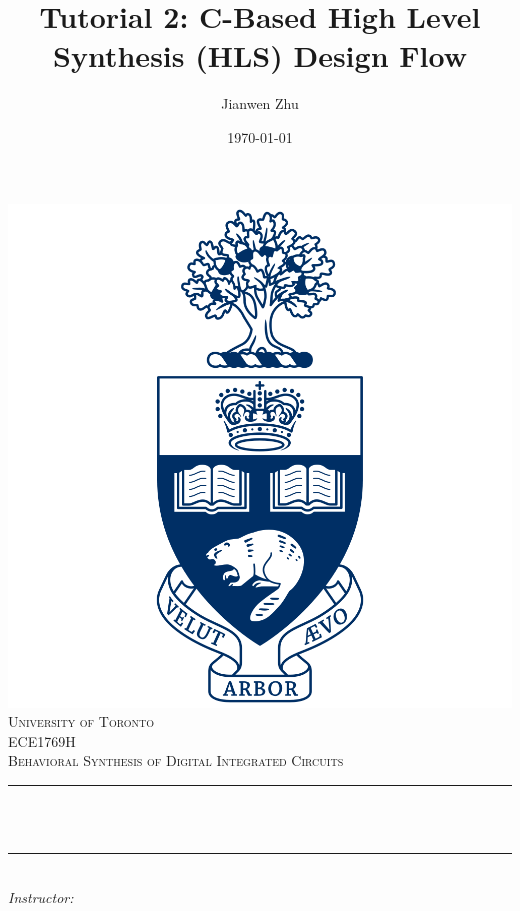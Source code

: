 \documentclass[12pt]{article}
\title{Tutorial 2: C-Based High Level Synthesis (HLS) Design Flow}		%
\author{Jianwen Zhu}								%
\date{\today}									%
\makeatletter
\newcommand{\course} {ECE1769H}
\let\thetitle\@title
\let\theauthor\@author
\makeatother
\begin{document}

\begin{titlepage}
	\centering
    \vspace*{0.5 cm}
    \includegraphics[scale = 0.12]{UofT.png}\\[1.0 cm]	%
    \textsc{\LARGE University of Toronto}\\[2.0 cm]	%
	\textsc{\Large \course}\\[0.5 cm]				%
	\textsc{\large Behavioral Synthesis of Digital Integrated Circuits}\\[0.5 cm]				%
	\rule{\linewidth}{0.2 mm} \\[0.4 cm]
	{ \huge \bfseries \thetitle}\\
	\rule{\linewidth}{0.2 mm} \\[1.5 cm]
	
		\large
			\emph{Instructor:}\\
			\theauthor 
			
 
	\vfill
	
\end{titlepage}
\end{document}

